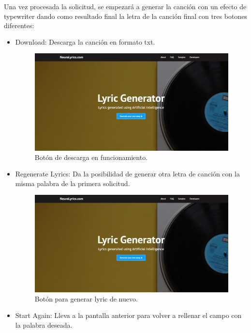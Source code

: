 \documentclass[12pt, a4paper, titlepage]{article}
\begin{document}
	Una vez procesada la solicitud, se empezará a generar la canción con un efecto de typewriter dando como resultado final la letra de la canción final con tres botones diferentes:
	\begin{itemize}
		\item Download: Descarga la canción en formato txt.
		
		\begin{figure}[H] 
			\includegraphics[width=13.5cm]{./Imagenes/Capturas/pprincipal.jpg}
			\centering \caption{Botón de descarga en funcionamiento.}
		\end{figure}
		
		\item Regenerate Lyrics: Da la posibilidad de generar otra letra de canción con la misma palabra de la primera solicitud.
		
		\begin{figure}[H] 
			\includegraphics[width=13.5cm]{./Imagenes/Capturas/pprincipal.jpg}
			\centering \caption{Botón para generar lyric de nuevo.}
		\end{figure}
		
		\item Start Again: Lleva a la pantalla anterior para volver a rellenar el campo con la palabra deseada.
		

\end{itemize}
\end{document}
